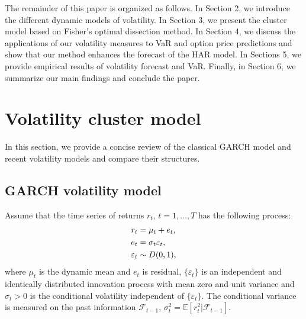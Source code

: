 \documentclass[preprint,12pt,authoryear]{elsarticle}
\begin{document}

The remainder of this paper is organized as follows. In Section 2,
we introduce the different dynamic models of volatility.
In Section 3, we present the cluster model based on
Fisher's optimal dissection method. In Section 4, we discuss the
applications of our volatility measures to VaR and option price predictions
and show that our method enhances the forecast of the HAR model.
In Sections 5, we provide empirical results of volatility forecast and VaR.
Finally, in Section 6, we summarize our main findings and conclude the paper.


\section{Volatility cluster model}
In this section, we provide a concise review of the classical GARCH model and recent volatility models and compare their structures.

\subsection{GARCH volatility model}
Assume that the time series of returns $r_t$, $t=1,\dots,T$ has the following process:
\begin{align}\label{equa1}
	r_t&=\mu_t+ e_t, \notag\\
	e_t&=\sigma_t\varepsilon_t,  \notag\\
	\varepsilon_t&\sim D(0,1),
\end{align}
where $\mu_t$ is the dynamic mean and $e_t$ is residual, $\{\varepsilon_t\}$ is an independent and identically distributed innovation process with mean zero and unit variance and $\sigma_t>0$ is the conditional volatility independent of $\{\varepsilon_t\}$. The conditional variance is measured on the past information $\mathcal{F}_{t-1}$, $\sigma_t^2=\mathbb{E}[r_t^2|\mathcal{F}_{t-1}].$
\end{document}
